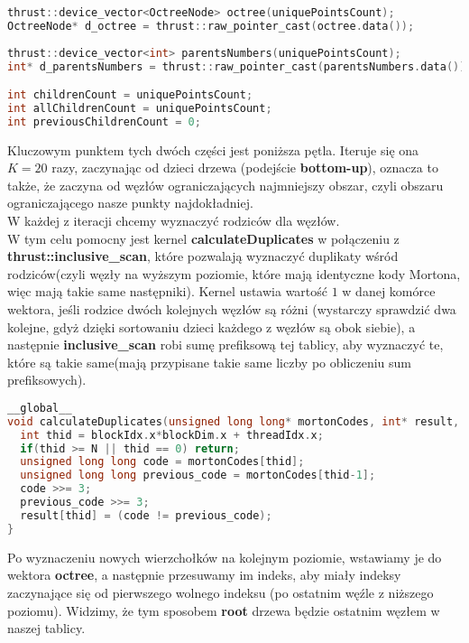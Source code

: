 \documentclass[14pt,twoside,a4paper]{article}
\theoremstyle{definition}
\begin{document}
\begin{lstlisting}[language=C++, frame=single, framerule=2pt, caption=Przechowywanie węzłów drzewa]
thrust::device_vector<OctreeNode> octree(uniquePointsCount);
OctreeNode* d_octree = thrust::raw_pointer_cast(octree.data());
	
thrust::device_vector<int> parentsNumbers(uniquePointsCount);
int* d_parentsNumbers = thrust::raw_pointer_cast(parentsNumbers.data());

int childrenCount = uniquePointsCount;
int allChildrenCount = uniquePointsCount;
int previousChildrenCount = 0;
\end{lstlisting}

Kluczowym punktem tych dwóch części jest poniższa pętla. Iteruje się ona $K=20$ razy, zaczynając od dzieci drzewa (podejście \textbf{bottom-up}), oznacza to także, że zaczyna od węzłów ograniczających najmniejszy obszar, czyli obszaru ograniczającego nasze punkty najdokładniej.\\
W każdej z iteracji chcemy wyznaczyć rodziców dla węzłów. \\W tym celu pomocny jest kernel \textbf{calculateDuplicates} w połączeniu z \textbf{thrust::inclusive\_scan}, które pozwalają wyznaczyć duplikaty wśród rodziców(czyli węzły na wyższym poziomie, które mają identyczne kody Mortona, więc mają takie same następniki).
Kernel ustawia wartość $1$ w danej komórce wektora, jeśli rodzice dwóch kolejnych węzłów są różni (wystarczy sprawdzić dwa kolejne, gdyż dzięki sortowaniu dzieci każdego z węzłów są obok siebie), a następnie \textbf{inclusive\_scan} robi sumę prefiksową tej tablicy, aby wyznaczyć te, które są takie same(mają przypisane takie same liczby po obliczeniu sum prefiksowych).

\begin{lstlisting}[language=C++, frame=single, framerule=2pt, caption=Kernel calculateDuplicates]
__global__
void calculateDuplicates(unsigned long long* mortonCodes, int* result, int N) {
  int thid = blockIdx.x*blockDim.x + threadIdx.x;
  if(thid >= N || thid == 0) return;
  unsigned long long code = mortonCodes[thid];
  unsigned long long previous_code = mortonCodes[thid-1];
  code >>= 3;
  previous_code >>= 3;
  result[thid] = (code != previous_code);
}

\end{lstlisting}
\bigskip
Po wyznaczeniu nowych wierzchołków na kolejnym poziomie, wstawiamy je do wektora \textbf{octree}, a następnie przesuwamy im indeks, aby miały indeksy zaczynające się od pierwszego wolnego indeksu (po ostatnim węźle z niższego poziomu). Widzimy, że tym sposobem \textbf{root} drzewa będzie ostatnim węzłem w naszej tablicy.
\end{document}
